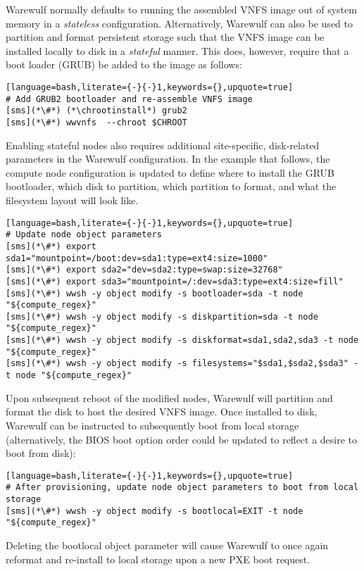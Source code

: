 Warewulf normally defaults to running the assembled VNFS image out of system
memory in a {\em stateless} configuration. Alternatively, Warewulf can also be
used to partition and format persistent storage such that the VNFS image can be
installed locally to disk in a {\em stateful} manner.  This does, however,
require that a boot loader (GRUB) be added to the image as follows:

\begin{lstlisting}[language=bash,literate={-}{-}1,keywords={},upquote=true]
# Add GRUB2 bootloader and re-assemble VNFS image
[sms](*\#*) (*\chrootinstall*) grub2
[sms](*\#*) wwvnfs  --chroot $CHROOT
\end{lstlisting}

\noindent Enabling stateful nodes also requires additional site-specific, disk-related
parameters in the Warewulf configuration. In the example that follows, the
compute node configuration is updated to define where to install the GRUB
bootloader, which disk to partition, which partition to format, and what the
filesystem layout will look like.

\begin{lstlisting}[language=bash,literate={-}{-}1,keywords={},upquote=true]
# Update node object parameters
[sms](*\#*) export sda1="mountpoint=/boot:dev=sda1:type=ext4:size=1000"
[sms](*\#*) export sda2="dev=sda2:type=swap:size=32768"
[sms](*\#*) export sda3="mountpoint=/:dev=sda3:type=ext4:size=fill"
[sms](*\#*) wwsh -y object modify -s bootloader=sda -t node "${compute_regex}" 
[sms](*\#*) wwsh -y object modify -s diskpartition=sda -t node "${compute_regex}" 
[sms](*\#*) wwsh -y object modify -s diskformat=sda1,sda2,sda3 -t node "${compute_regex}" 
[sms](*\#*) wwsh -y object modify -s filesystems="$sda1,$sda2,$sda3" -t node "${compute_regex}" 
\end{lstlisting}

\noindent Upon subsequent reboot of the modified nodes, Warewulf will partition
and format the disk to host the desired VNFS image.  Once installed to disk,
Warewulf can be instructed to subsequently boot from local storage
(alternatively, the BIOS boot option order could be updated to reflect a desire
to boot from disk):

\begin{lstlisting}[language=bash,literate={-}{-}1,keywords={},upquote=true]
# After provisioning, update node object parameters to boot from local storage
[sms](*\#*) wwsh -y object modify -s bootlocal=EXIT -t node "${compute_regex}"
\end{lstlisting}


\noindent Deleting the bootlocal object parameter will cause Warewulf to once
again reformat and re-install to local storage upon a new PXE boot request.
